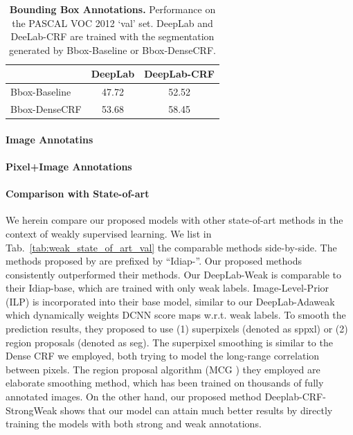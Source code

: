 \begin{table}
  \centering
  \caption{{\bf Bounding Box Annotations.} Performance on the PASCAL VOC 2012 `val' set. DeepLab and DeeLab-CRF are trained with the segmentation generated by Bbox-Baseline or Bbox-DenseCRF.}
  \begin{tabular}{| l | c | c |}
    \hline
     & DeepLab & DeepLab-CRF \\
    \hline
    Bbox-Baseline & 47.72 & 52.52 \\ 
    \hline
    Bbox-DenseCRF & 53.68 & 58.45 \\
    \hline
    \end{tabular}
  \label{tb:bbox_annot}
\end{table}

\paragraph{Image Annotatins}

\paragraph{Pixel+Image Annotations}

\paragraph{Comparison with State-of-art} We herein compare our proposed models with other state-of-art methods in the context of weakly supervised learning. We list in Tab.~\ref{tab:weak_state_of_art_val} the comparable methods side-by-side. The methods proposed by \citet{pinheiro2014weakly} are prefixed by ``Idiap-''. Our proposed methods consistently outperformed their methods. Our DeepLab-Weak is comparable to their Idiap-base, which are trained with only weak labels. Image-Level-Prior (ILP) is incorporated into their base model, similar to our DeepLab-Adaweak which dynamically weights DCNN score maps w.r.t. weak labels. To smooth the prediction results, they proposed to use (1) superpixels (denoted as sppxl) or (2) region proposals (denoted as seg). The superpixel smoothing is similar to the Dense CRF we employed, both trying to model the long-range correlation between pixels. The region proposal algorithm (MCG \citep{arbelaez2014multiscale}) they employed are elaborate smoothing method, which has been trained on thousands of fully annotated images. On the other hand, our proposed method Deeplab-CRF-StrongWeak shows that our model can attain much better results by directly training the models with both strong and weak annotations.

